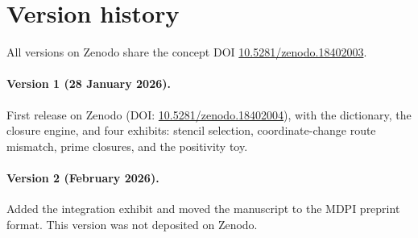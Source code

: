 \section{Version history}
\label{app:versions}

All versions on Zenodo share the concept DOI \href{https://doi.org/10.5281/zenodo.18402003}{10.5281/zenodo.18402003}.

\paragraph{Version 1 (28 January 2026).}
First release on Zenodo (DOI: \href{https://doi.org/10.5281/zenodo.18402004}{10.5281/zenodo.18402004}), with the dictionary, the closure engine, and four exhibits: stencil selection, coordinate-change route mismatch, prime closures, and the positivity toy.

\paragraph{Version 2 (February 2026).}
Added the integration exhibit and moved the manuscript to the MDPI preprint format. This version was not deposited on Zenodo.

